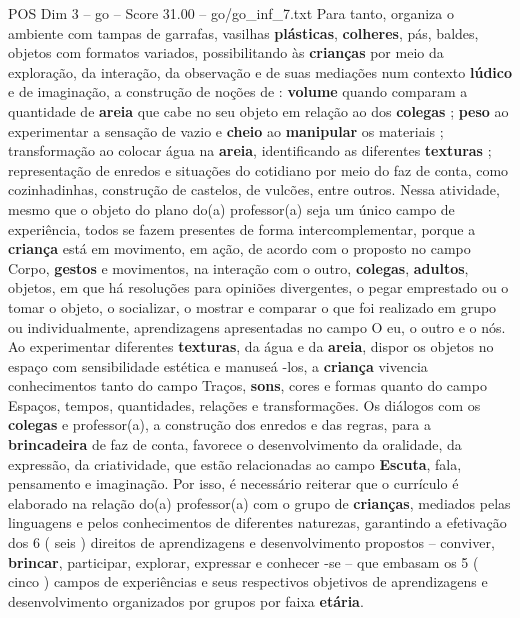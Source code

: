 \begin{textsample}{POS Dim 3 – go – Score 31.00 – go/go\_inf\_7.txt}
Para tanto, organiza o ambiente com tampas de garrafas, vasilhas \textbf{plásticas}, \textbf{colheres}, pás, baldes, objetos com formatos variados, possibilitando às \textbf{crianças} por meio da exploração, da interação, da observação e de suas mediações num contexto \textbf{lúdico} e de imaginação, a construção de noções de : \textbf{volume} quando comparam a quantidade de \textbf{areia} que cabe no seu objeto em relação ao dos \textbf{colegas} ; \textbf{peso} ao experimentar a sensação de vazio e \textbf{cheio} ao \textbf{manipular} os materiais ; transformação ao colocar água na \textbf{areia}, identificando as diferentes \textbf{texturas} ; representação de enredos e situações do cotidiano por meio do faz de conta, como cozinhadinhas, construção de castelos, de vulcões, entre outros.
Nessa atividade, mesmo que o objeto do plano do(a) professor(a) seja um único campo de experiência, todos se fazem presentes de forma intercomplementar, porque a \textbf{criança} está em movimento, em ação, de acordo com o proposto no campo Corpo, \textbf{gestos} e movimentos, na interação com o outro, \textbf{colegas}, \textbf{adultos}, objetos, em que há resoluções para opiniões divergentes, o pegar emprestado ou o tomar o objeto, o socializar, o mostrar e comparar o que foi realizado em grupo ou individualmente, aprendizagens apresentadas no campo O eu, o outro e o nós.
Ao experimentar diferentes \textbf{texturas}, da água e da \textbf{areia}, dispor os objetos no espaço com sensibilidade estética e manuseá -los, a \textbf{criança} vivencia conhecimentos tanto do campo Traços, \textbf{sons}, cores e formas quanto do campo Espaços, tempos, quantidades, relações e transformações.
Os diálogos com os \textbf{colegas} e professor(a), a construção dos enredos e das regras, para a \textbf{brincadeira} de faz de conta, favorece o desenvolvimento da oralidade, da expressão, da criatividade, que estão relacionadas ao campo \textbf{Escuta}, fala, pensamento e imaginação.
Por isso, é necessário reiterar que o currículo é elaborado na relação do(a) professor(a) com o grupo de \textbf{crianças}, mediados pelas linguagens e pelos conhecimentos de diferentes naturezas, garantindo a efetivação dos 6 ( seis ) direitos de aprendizagens e desenvolvimento propostos – conviver, \textbf{brincar}, participar, explorar, expressar e conhecer -se – que embasam os 5 ( cinco ) campos de experiências e seus respectivos objetivos de aprendizagens e desenvolvimento organizados por grupos por faixa \textbf{etária}.

\end{textsample}
